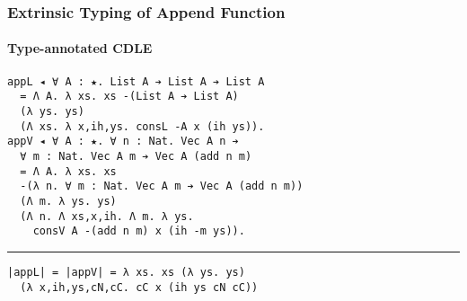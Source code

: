 \documentclass[mathserif,usenames,dvipsnames]{beamer}
\begin{document}
\begin{frame}[fragile]
\frametitle{Extrinsic Typing of Append Function}
\framesubtitle{Type-annotated CDLE}

\begin{verbatim}
appL ◂ ∀ A : ★. List A ➔ List A ➔ List A
  = Λ A. λ xs. xs -(List A ➔ List A)
  (λ ys. ys)
  (Λ xs. λ x,ih,ys. consL -A x (ih ys)).
appV ◂ ∀ A : ★. ∀ n : Nat. Vec A n ➔ 
  ∀ m : Nat. Vec A m ➔ Vec A (add n m)
  = Λ A. λ xs. xs 
  -(λ n. ∀ m : Nat. Vec A m ➔ Vec A (add n m))
  (Λ m. λ ys. ys)
  (Λ n. Λ xs,x,ih. Λ m. λ ys. 
    consV A -(add n m) x (ih -m ys)).
\end{verbatim}

\noindent\rule{\textwidth}{1pt}

\begin{verbatim}
|appL| = |appV| = λ xs. xs (λ ys. ys) 
  (λ x,ih,ys,cN,cC. cC x (ih ys cN cC))
\end{verbatim}

\end{frame}
\end{document}
